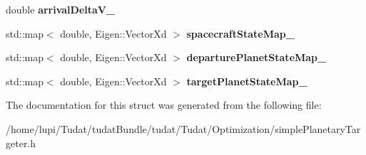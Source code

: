 \begin{DoxyCompactItemize}
\item 
double {\bfseries arrival\+Delta\+V\+\_\+}\hypertarget{structtudat_1_1optimization_1_1UnperturbedNumericalPlanetaryTargeter_ad96ad41bf7cfc37cb7166e97507b0984}{}\label{structtudat_1_1optimization_1_1UnperturbedNumericalPlanetaryTargeter_ad96ad41bf7cfc37cb7166e97507b0984}

\item 
std\+::map$<$ double, Eigen\+::\+Vector\+Xd $>$ {\bfseries spacecraft\+State\+Map\+\_\+}\hypertarget{structtudat_1_1optimization_1_1UnperturbedNumericalPlanetaryTargeter_accae3c066e6b85d761200ef4e9da221c}{}\label{structtudat_1_1optimization_1_1UnperturbedNumericalPlanetaryTargeter_accae3c066e6b85d761200ef4e9da221c}

\item 
std\+::map$<$ double, Eigen\+::\+Vector\+Xd $>$ {\bfseries departure\+Planet\+State\+Map\+\_\+}\hypertarget{structtudat_1_1optimization_1_1UnperturbedNumericalPlanetaryTargeter_a6b25ee32a6feb478e3cb6a532818bccd}{}\label{structtudat_1_1optimization_1_1UnperturbedNumericalPlanetaryTargeter_a6b25ee32a6feb478e3cb6a532818bccd}

\item 
std\+::map$<$ double, Eigen\+::\+Vector\+Xd $>$ {\bfseries target\+Planet\+State\+Map\+\_\+}\hypertarget{structtudat_1_1optimization_1_1UnperturbedNumericalPlanetaryTargeter_a05608b41a9cfec8cf982951200df3ea3}{}\label{structtudat_1_1optimization_1_1UnperturbedNumericalPlanetaryTargeter_a05608b41a9cfec8cf982951200df3ea3}

\end{DoxyCompactItemize}


The documentation for this struct was generated from the following file\+:\begin{DoxyCompactItemize}
\item 
/home/lupi/\+Tudat/tudat\+Bundle/tudat/\+Tudat/\+Optimization/simple\+Planetary\+Targeter.\+h\end{DoxyCompactItemize}
